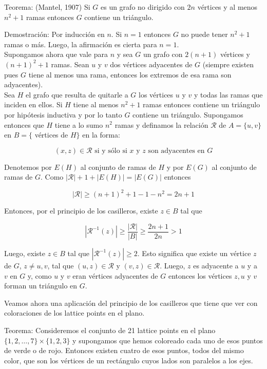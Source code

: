 \documentclass[10pt]{article}
\begin{document}
Teorema: (Mantel, 1907) Si $G$ es un grafo no dirigido con $2 n$ vértices y al menos $n^{2}+1$ ramas entonces $G$ contiene un triángulo.

Demostración: Por inducción en $n$. Si $n=1$ entonces $G$ no puede tener $n^{2}+1$ ramas o más. Luego, la afirmación es cierta para $n=1$.\\
Supongamos ahora que vale para $n$ y sea $G$ un grafo con $2(n+1)$ vértices y $(n+1)^{2}+1$ ramas. Sean $u$ y $v$ dos vértices adyacentes de $G$ (siempre existen pues $G$ tiene al menos una rama, entonces los extremos de esa rama son adyacentes).\\
Sea $H$ el grafo que resulta de quitarle a $G$ los vértices $u$ y $v$ y todas las ramas que inciden en ellos. Si $H$ tiene al menos $n^{2}+1$ ramas entonces contiene un triángulo por hipótesis inductiva y por lo tanto $G$ contiene un triángulo. Supongamos entonces que $H$ tiene a lo sumo $n^{2}$ ramas y definamos la relación $\mathcal{R}$ de $A=\{u, v\}$ en $B=\{$ vértices de $H\}$ en la forma:

$$
(x, z) \in \mathcal{R} \text { si y sólo si } x \text { y } z \text { son adyacentes en } G
$$

Denotemos por $E(H)$ al conjunto de ramas de $H$ y por $E(G)$ al conjunto de ramas de $G$. Como $|\mathcal{R}|+1+|E(H)|=|E(G)|$ entonces

$$
|\mathcal{R}| \geq(n+1)^{2}+1-1-n^{2}=2 n+1
$$

Entonces, por el principio de los casilleros, existe $z \in B$ tal que

$$
\left|\mathcal{R}^{-1}(z)\right| \geq \frac{|\mathcal{R}|}{|B|} \geq \frac{2 n+1}{2 n}>1
$$

Luego, existe $z \in B$ tal que $\left|\mathcal{R}^{-1}(z)\right| \geq 2$. Esto significa que existe un vértice $z$ de $G$, $z \neq u, v$, tal que $(u, z) \in \mathcal{R}$ y $(v, z) \in \mathcal{R}$. Luego, $z$ es adyacente a $u$ y a $v$ en $G$ y, como $u$ y $v$ eran vértices adyacentes de $G$ entonces los vértices $z, u$ y $v$ forman un triángulo en $G$.

Veamos ahora una aplicación del principio de los casilleros que tiene que ver con coloraciones de los lattice points en el plano.

Teorema: Consideremos el conjunto de 21 lattice points en el plano $\{1,2, \ldots, 7\} \times\{1,2,3\}$ y supongamos que hemos coloreado cada uno de esos puntos de verde o de rojo. Entonces existen cuatro de esos puntos, todos del mismo color, que son los vértices de un rectángulo cuyos lados son paralelos a los ejes.
\end{document}
